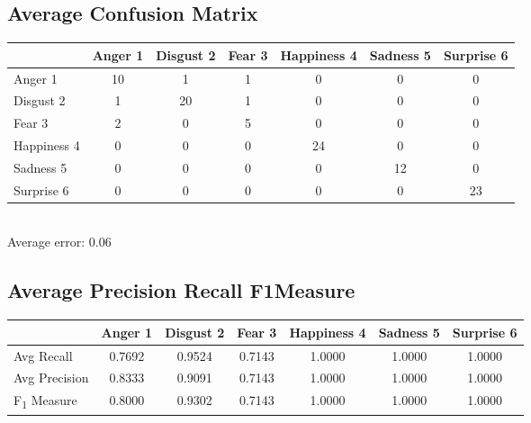 \documentclass[a4paper,11pt]{article}
\begin{document}
\subsection{Average Confusion Matrix}
\begin{center}                                                                  
      \begin{tabular}{ | l || c | c | c | c | c | c | }                           
      \hline                                                                      
            & Anger 1 & Disgust 2 & Fear 3 & Happiness 4 & Sadness 5 & Surprise 6 \\ \hline \hline
          Anger 1 		& 10 & 1 & 1 & 0 & 0 & 0 \\ \hline                               
          Disgust 2 	& 1 & 20 & 1 & 0 & 0 & 0 \\ \hline                            
          Fear 3 		& 2 & 0 & 5 & 0 & 0 & 0 \\ \hline                                
          Happiness 4 	& 0 & 0 & 0 & 24 & 0 & 0 \\ \hline                          
          Sadness 5 	& 0 & 0 & 0 & 0 & 12 & 0 \\ \hline                             
          Surprise 6 	& 0 & 0 & 0 & 0 & 0 & 23 \\ \hline                           
     \end{tabular}                                                               
    \\ Average error: 0.06
\end{center}                                                                    

\subsection{Average Precision Recall F1Measure}

  \begin{center}                                                                  
  \begin{tabular}{ | l || c | c | c | c | c | c | }                               
     \hline                                                                      
        & Anger 1 & Disgust 2 & Fear 3 & Happiness 4 & Sadness 5 & Surprise 6 \\ \hline \hline
         Avg Recall                 & 0.7692 & 0.9524 & 0.7143 & 1.0000 & 1.0000 & 1.0000 \\ \hline   
         Avg Precision 				& 0.8333 & 0.9091 & 0.7143 & 1.0000 & 1.0000 & 1.0000 \\ \hline
        F\textsubscript{1} Measure  & 0.8000 & 0.9302 & 0.7143 & 1.0000 & 1.0000 & 1.0000 \\ \hline
      \end{tabular}                                                               
 \end{center}                                                                    
\end{document}
